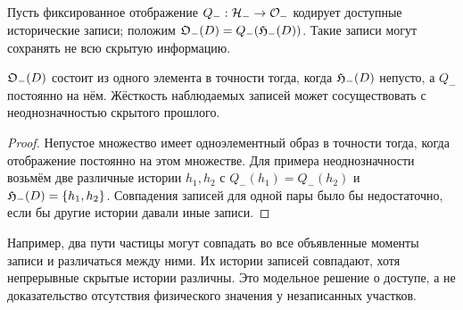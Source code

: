 \subsection{}
{Пусть фиксированное отображение $Q_-:\mathcal H_-\to\mathcal O_-$ кодирует доступные исторические записи; положим $\mathfrak O_-(D)=Q_-(\mathfrak H_-(D))$. Такие записи могут сохранять не всю скрытую информацию.}
\begin{proposition}
\label{prop:observable-rigidity}
{$\mathfrak O_-(D)$ состоит из одного элемента в точности тогда, когда $\mathfrak H_-(D)$ непусто, а $Q_-$ постоянно на нём. Жёсткость наблюдаемых записей может сосуществовать с неоднозначностью скрытого прошлого.}
\end{proposition}
\begin{proof}
{Непустое множество имеет одноэлементный образ в точности тогда, когда отображение постоянно на этом множестве. Для примера неоднозначности возьмём две различные истории $h_1,h_2$ с $Q_-(h_1)=Q_-(h_2)$ и $\mathfrak H_-(D)=\{h_1,h_2\}$. Совпадения записей для одной пары было бы недостаточно, если бы другие истории давали иные записи.}
\end{proof}

{Например, два пути частицы могут совпадать во все объявленные моменты записи и различаться между ними. Их истории записей совпадают, хотя непрерывные скрытые истории различны. Это модельное решение о доступе, а не доказательство отсутствия физического значения у незаписанных участков.}

